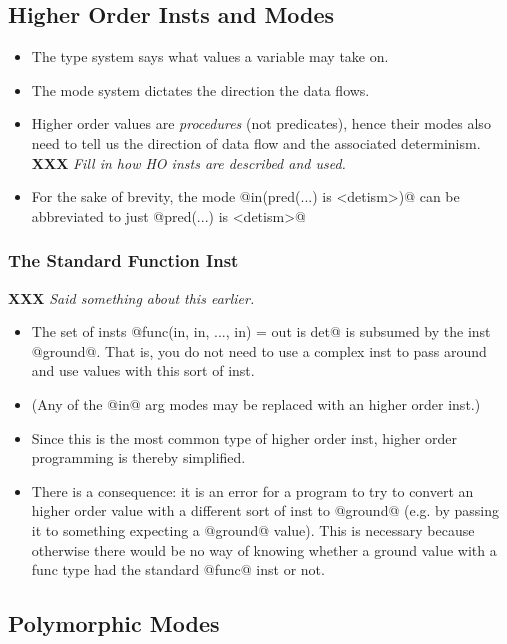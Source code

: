 \documentclass[a4paper,11pt,notitlepage,onecolumn]{article}
\newcommand{\XXX}[1]%
{{\small\textbf{XXX} \emph{#1}}}
\begin{document}
\subsection{Higher Order Insts and Modes}

\begin{itemize}
\item The type system says what values a variable may take on.
\item The mode system dictates the direction the data flows.
\item Higher order values are \emph{procedures} (not predicates), hence
  their modes also need to tell us the direction of data flow
  and the associated determinism.  \XXX{Fill in how HO insts are
  described and used.}
\item For the sake of brevity, the mode @in(pred(...) is <detism>)@
  can be abbreviated to just @pred(...) is <detism>@
\end{itemize}

\subsubsection{The Standard Function Inst}

\XXX{Said something about this earlier.}

\begin{itemize}
\item The set of insts @func(in, in, ..., in) = out is det@ is
  subsumed by the inst @ground@.  That is, you do not need to
  use a complex inst to pass around and use values with this
  sort of inst.
\item (Any of the @in@ arg modes may be replaced with an higher
  order inst.)
\item Since this is the most common type of higher order inst,
  higher order programming is thereby simplified.
\item There is a consequence: it is an error for a program to try
  to convert an higher order value with a different sort of
  inst to @ground@ (e.g. by passing it to something expecting a
  @ground@ value).  This is necessary because otherwise there
  would be no way of knowing whether a ground value with a
  func type had the standard @func@ inst or not.
\end{itemize}

\subsection{Polymorphic Modes}
\end{document}
